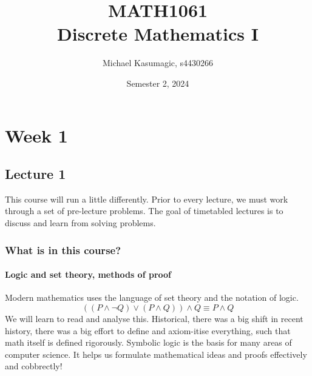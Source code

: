 \documentclass{report}
\title{\Huge{MATH1061}\\Discrete Mathematics I}
\author{\huge{Michael Kasumagic, s4430266}}
\date{\huge{Semester 2, 2024}}
\begin{document}
\maketitle%
\tableofcontents
\pagebreak

\chapter{Week 1}
\section{Lecture 1}
This course will run a little differently. Prior to every lecture, we must work through a set of pre-lecture problems. The goal of timetabled lectures is to discuss and learn from solving problems.

\subsection*{What is in this course?}
\subsubsection*{Logic and set theory, methods of proof}
Modern mathematics uses the language of set theory and the notation of logic.
$$
((P \land \lnot Q) \lor (P\land Q)) \land Q \equiv P \land Q
$$
We will learn to read and analyse this. Historical, there was a big shift in recent history, there was a big effort to define and axiom-itise everything, such that math itself is defined rigorously. Symbolic logic is the basis for many areas of computer science. It helps us formulate mathematical ideas and proofs effectively and cobbrectly! \\

\end{document}
